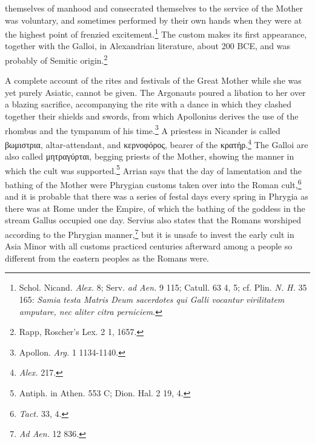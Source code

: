 \documentclass[a4paper, 11pt, oneside, polutonikogreek, french]{article}
\begin{document}
themselves of manhood and consecrated themselves to the service of the Mother was voluntary, and sometimes performed by their own hands when they were at the highest point of frenzied excitement.\footnote{Schol. Nicand. \emph{Alex.} 8; Serv. \emph{ad Aen.} 9 115; Catull. 63 4, 5; cf. Plin. \emph{N. H.} 35 165: \emph{Samia testa Matris Deum sacerdotes qui Galli vocantur virilitatem amputare, nec aliter citra perniciem}.} The custom makes its first appearance, together with the Galloi, in Alexandrian literature, about 200 \textsc{BCE}, and was probably of Semitic origin.\footnote{Rapp, Roscher's Lex. 2 1, 1657.}

A complete account of the rites and festivals of the Great Mother while she was yet purely Asiatic, cannot be given. The Argonauts poured a libation to her over a blazing sacrifice, accompanying the rite with a dance in which they clashed together their shields and swords, from which Apollonius derives the use of the rhombus and the tympanum of his time.\footnote{Apollon. \emph{Arg.} 1 1134-1140.} A priestess in Nicander is called βωμιστρια, altar-attendant, and κερνοφόρος, bearer of the κρατήρ.\footnote{\emph{Alex.} 217.} The Galloi are also called μητραγύρται, begging priests of the Mother, showing the manner in which the cult was supported.\footnote{Antiph. in Athen. 553 C; Dion. Hal. 2 19, 4.} Arrian says that the day of lamentation and the bathing of the Mother were Phrygian customs taken over into the Roman cult,\footnote{\emph{Tact.} 33, 4.} and it is probable that there was a series of festal days every spring in Phrygia as there was at Rome under the Empire, of which the bathing of the goddess in the stream Gallus occupied one day. Servius also states that the Romans worshiped according to the Phrygian manner,\footnote{\emph{Ad Aen.} 12 836.} but it is unsafe to invest the early cult in Asia Minor with all customs practiced centuries afterward among a people so different from the eastern peoples as the Romans were.
\end{document}
